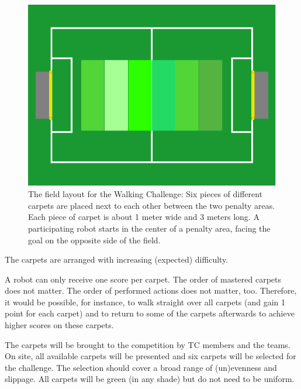 \documentclass[12pt]{article}
\begin{document}
\begin{figure}[th!]
\centerline{\includegraphics[width=0.6\columnwidth]{figures/walking-challenge}}
\caption{The field layout for the Walking Challenge: Six pieces of different carpets are placed next to each other between the two penalty areas. Each piece of carpet is about 1 meter wide and 3 meters long. A participating robot starts in the center of a penalty area, facing the goal on the opposite side of the field.}
\label{fig:walking_challenge}
\end{figure}

The carpets are arranged with increasing (expected) difficulty. 

A robot can only receive one score per carpet. The order of mastered carpets does not matter. The order of performed actions does not matter, too. Therefore, it would be possible, for instance, to walk straight over all carpets (and gain 1 point for each carpet) and to return to some of the carpets afterwards to achieve higher scores on these carpets.

The carpets will be brought to the competition by TC members and the teams. On site, all available carpets will be presented and six carpets will be selected for the challenge. The selection should cover a broad range of (un)evenness and slippage. All carpets will be green (in any shade) but do not need to be uniform.

\end{document}
